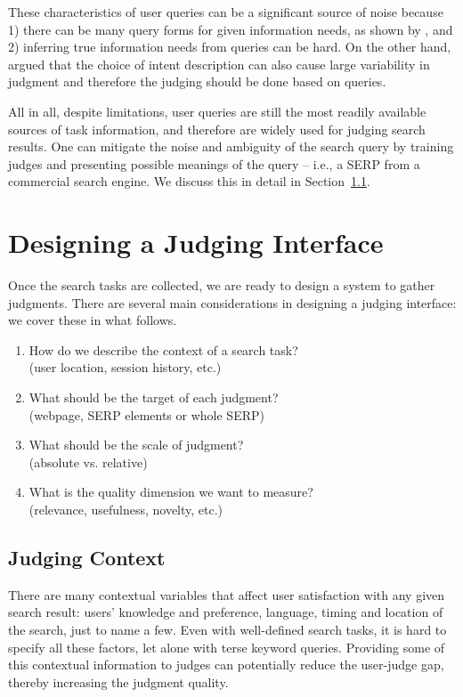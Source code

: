 \documentclass[openany]{now} %
\newcommand{\authornote}[3]{\marginpar{\tiny\color{#1}#2: #3}{\color{#1}{$\star$}}}
\newcommand{\paul}[1]{\authornote{blue}{Paul}{#1}}
\begin{document}
These characteristics of user queries can be a significant source of noise because 1) there can be many query forms for given information needs, as shown by \cite{Bailey:2015:UVI}, and 2) inferring true information needs from queries can be hard. On the other hand, \cite{Yilmaz:2014:EID} argued that the choice of intent description can also cause large variability in judgment and therefore the judging should be done based on queries.

All in all, despite limitations, user queries are still the most readily available sources of task information, and therefore are widely used for judging search results. One can mitigate the noise and ambiguity of the search query by training judges and presenting possible meanings of the query -- i.e., a SERP from a commercial search engine. We discuss this in detail in Section~\ref{s:judging-context}.

\section{Designing a Judging Interface}

Once the search tasks are collected, we are ready to design a system to gather judgments. There are several main considerations in designing a judging interface: we cover these in what follows.

\begin{enumerate}
	\item  How do we describe the context of a search task? \\(user location, session history, etc.)
	\item  What should be the target of each judgment? \\(webpage, SERP elements or whole SERP)
	\item  What should be the scale of judgment? \\(absolute vs. relative)	
	\item  What is the quality dimension we want to measure? \\(relevance, usefulness, novelty, etc.)
\end{enumerate}

\subsection{Judging Context}
\label{s:judging-context}
There are many contextual variables that affect user satisfaction with any given search result: users' knowledge and preference, language, timing and location of the search, just to name a few. Even with well-defined search tasks, it is hard to specify all these factors, let alone with terse keyword queries. Providing some of this contextual information to judges can potentially reduce the user-judge gap, thereby increasing the judgment quality. \paul{refs?} 
\end{document}
